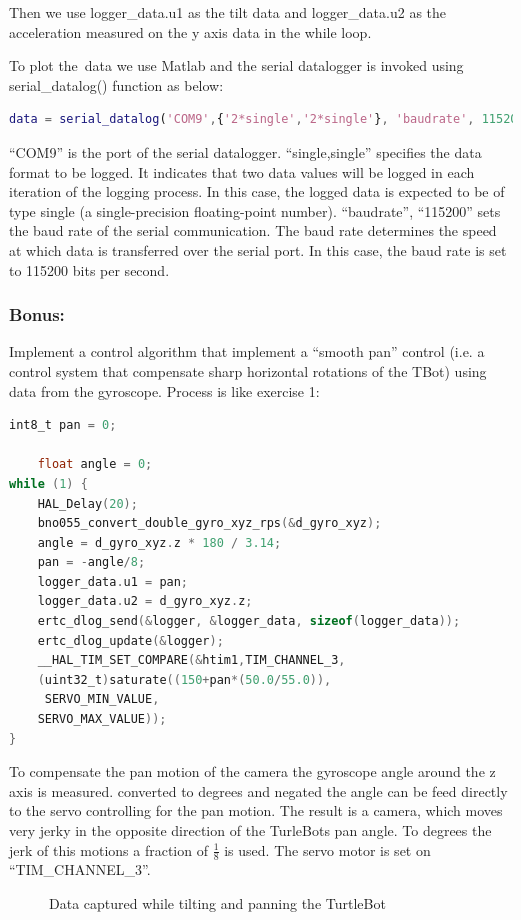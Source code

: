 \documentclass[english]{article}
\begin{document}
Then we use logger\_data.u1 as the tilt data and logger\_data.u2 as the acceleration
measured on the y axis data in the while loop. 
\newline

To plot the\ data we use Matlab and the serial datalogger is invoked using serial\_datalog()
 function as below: 
\begin{lstlisting}[language=Matlab, caption={}, label={lst:serialDatalog} ]
data = serial_datalog('COM9',{'2*single','2*single'}, 'baudrate', 115200)
\end{lstlisting}
“COM9” is the port of the serial datalogger. “single,single” specifies the data 
format to be logged. It indicates that two data values will be logged in each 
iteration of the logging process. In this case, the logged data is expected to be
of type single (a single-precision floating-point number).\newline  
“baudrate”, “115200” sets the baud rate of the serial communication. 
The baud rate determines the speed at which data is transferred over the serial port.
 In this case, the baud rate is set to 115200 bits per second. 

\subsubsection{Bonus:}
Implement a control algorithm that implement a “smooth pan” control
(i.e. a control system that compensate sharp horizontal rotations of the TBot) 
using data from the gyroscope.\newline
Process is like exercise 1:

\begin{lstlisting}[language=C, caption={}, label={lst:smoothPan} ]
    int8_t pan = 0; 

    float angle = 0; 
while (1) { 
    HAL_Delay(20); 
    bno055_convert_double_gyro_xyz_rps(&d_gyro_xyz);
    angle = d_gyro_xyz.z * 180 / 3.14;
    pan = -angle/8;
    logger_data.u1 = pan; 
    logger_data.u2 = d_gyro_xyz.z; 
    ertc_dlog_send(&logger, &logger_data, sizeof(logger_data)); 
    ertc_dlog_update(&logger); 
    __HAL_TIM_SET_COMPARE(&htim1,TIM_CHANNEL_3,
    (uint32_t)saturate((150+pan*(50.0/55.0)),
     SERVO_MIN_VALUE,
    SERVO_MAX_VALUE));   
} 
\end{lstlisting}
 To compensate the pan motion of the camera the gyroscope angle around the z axis is measured. converted to degrees and negated the angle can be feed directly to the servo controlling for the pan motion. The result is a camera, which moves very jerky in the opposite direction of the TurleBots pan angle. To degrees the jerk of this motions a fraction of $\frac{1}{8}$ is used. The servo motor is set on “TIM\_CHANNEL\_3”.
\begin{figure}[tbh]
    \centering
    
    \caption{Data captured while tilting and panning the TurtleBot}
    \label{fig:datal2}
\end{figure}
\end{document}
